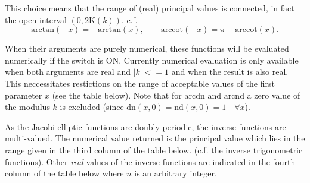 This choice means that the range of (real) principal values is
connected, in fact the open interval $(0, 2\mathrm{K}(k))$. c.f.
\[ \mathrm{arctan}(-x) = -\mathrm{arctan}(x),\qquad
  \mathrm{arccot}(-x) = \pi -\mathrm{arccot}(x). \]

When their arguments are purely numerical, these functions  will be evaluated
numerically if the  switch is ON.  Currently numerical evaluation
is only available when both arguments are real and $|k|<=1$ and when the
result is also real. This neccessitates restictions on the range of acceptable
values of the first parameter $x$ (see the table below). Note that for
$\mathrm{arcdn}$ and $\mathrm{arcnd}$ a zero value of the modulus $k$ is
excluded (since $\mathrm{dn}(x,0) = \mathrm{nd}(x,0) = 1 \quad \forall x$).

As the Jacobi elliptic functions are doubly periodic, the inverse functions
are multi-valued. The numerical value returned is the principal value which
lies in the range  given in the third column of the table below. 
(c.f. the inverse trigonometric functions). Other \emph{real} values of the
inverse functions are indicated in the fourth column of the table below where
$n$ is an arbitrary integer.

